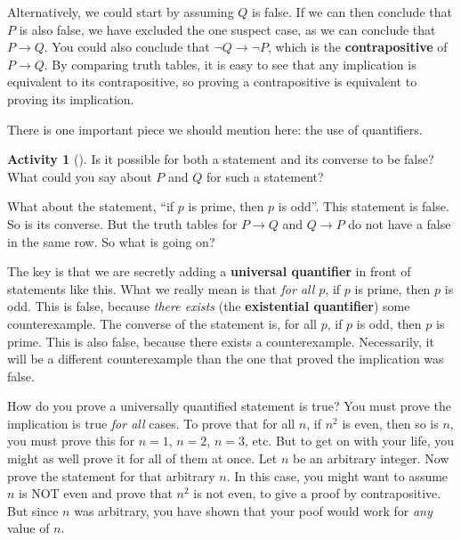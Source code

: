 \documentclass[10pt,]{book}
\newcommand{\terminology}[1]{\textbf{#1}}
\theoremstyle{plain}
\theoremstyle{definition}
\theoremstyle{definition}
\theoremstyle{definition}
\newtheorem{activity}[project]{Activity}
\numberwithin{equation}{chapter}
\def\imp{\rightarrow}
\begin{document}
Alternatively, we could start by assuming \(Q\) is false.  If we can then conclude that \(P\) is also false, we have excluded the one suspect case, as we can conclude that \(P \imp Q\).  You could also conclude that \(\neg Q \imp \neg P\), which is the \terminology{contrapositive} of \(P \imp Q\).  By comparing truth tables, it is easy to see that any implication is equivalent to its contrapositive, so proving a contrapositive is equivalent to proving its implication.%
\par
\hypertarget{p-173}{}%
There is one important piece we should mention here: the use of quantifiers.%
\begin{activity}[]\label{activity-9}
\hypertarget{p-174}{}%
Is it possible for both a statement and its converse to be false?  What could you say about \(P\) and \(Q\) for such a statement?%
\end{activity}
\hypertarget{p-175}{}%
What about the statement, ``if \(p\) is prime, then \(p\) is odd''.  This statement is false.  So is its converse.  But the truth tables for \(P \imp Q\) and \(Q \imp P\) do not have a false in the same row.  So what is going on?%
\par
\hypertarget{p-176}{}%
The key is that we are secretly adding a \terminology{universal quantifier} in front of statements like this.  What we really mean is that \emph{for all \(p\)}, if \(p\) is prime, then \(p\) is odd.  This is false, because \emph{there exists} (the \terminology{existential quantifier}) some counterexample.  The converse of the statement is, for all \(p\), if \(p\) is odd, then \(p\) is prime.  This is also false, because there exists a counterexample.  Necessarily, it will be a different counterexample than the one that proved the implication was false.%
\par
\hypertarget{p-177}{}%
How do you prove a universally quantified statement is true?  You must prove the implication is true \emph{for all} cases.  To prove that for all \(n\), if \(n^2\) is even, then so is \(n\), you must prove this for \(n = 1\), \(n = 2\), \(n =3\), etc.  But to get on with your life, you might as well prove it for all of them at once.  Let \(n\) be an arbitrary integer.  Now prove the statement for that arbitrary \(n\).  In this case, you might want to assume \(n\) is NOT even and prove that \(n^2\) is not even, to give a proof by contrapositive.  But since \(n\) was arbitrary, you have shown that your poof would work for \emph{any} value of \(n\).%
\typeout{************************************************}
\typeout{************************************************}
\end{document}
